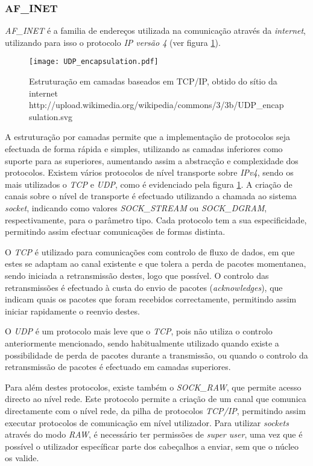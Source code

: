 \subsubsection{AF\_INET}
\label{subsub:af_inet}

\textit{AF\_INET} é a familia de endereços utilizada na comunicação através da \textit{internet}, utilizando para isso o protocolo \textit{IP versão 4} (ver figura \ref{fig:stack_tcp_ip}).

\begin{figure}[ht]
\centering
\texttt{[image: UDP\_encapsulation.pdf]}
\caption{Estruturação em camadas baseados em TCP/IP, obtido do sítio da internet http://upload.wikimedia.org/wikipedia/commons/3/3b/UDP\_encapsulation.svg}
\label{fig:stack_tcp_ip}
\end{figure}


A estruturação por camadas permite que a implementação de protocolos seja efectuada de forma rápida e simples, utilizando as camadas inferiores como suporte para as superiores, aumentando assim a abstracção e complexidade dos protocolos.
Existem vários protocolos de nível transporte sobre \textit{IPv4}, sendo os mais utilizados o \textit{TCP} e \textit{UDP}, como é evidenciado pela figura \ref{fig:stack_tcp_ip}.
A criação de canais sobre o nível de transporte é efectuado utilizando a chamada ao sistema \textit{socket}, indicando como valores \textit{SOCK\_STREAM} ou \textit{SOCK\_DGRAM}, respectivamente, para o parâmetro tipo.
Cada protocolo tem a sua especificidade, permitindo assim efectuar comunicações de formas distinta.

O \textit{TCP} é utilizado para comunicações com controlo de fluxo de dados, em que estes se adaptam ao canal existente e que tolera a perda de pacotes momentanea, sendo iniciada a retransmissão destes, logo que possível.
O controlo das retransmissões é efectuado à custa do envio de pacotes (\textit{acknowledges}), que indicam quais os pacotes que foram recebidos correctamente, permitindo assim iniciar rapidamente o reenvio destes.

O \textit{UDP} é um protocolo mais leve que o \textit{TCP}, pois não utiliza o controlo anteriormente mencionado, sendo habitualmente utilizado quando existe a possibilidade de perda de pacotes durante a transmissão, ou quando o controlo da retransmissão de pacotes é efectuado em camadas superiores.

Para além destes protocolos, existe também o \textit{SOCK\_RAW}, que permite acesso directo ao nível rede.
Este protocolo permite a criação de um canal que comunica directamente com o nível rede, da pilha de protocolos \textit{TCP/IP}, permitindo assim executar protocolos de comunicação em nível utilizador.
Para utilizar \textit{sockets} através do modo \textit{RAW}, é necessário ter permissões de \textit{super user}, uma vez que é possível o utilizador específicar parte dos cabeçalhos a enviar, sem que o núcleo os valide.


